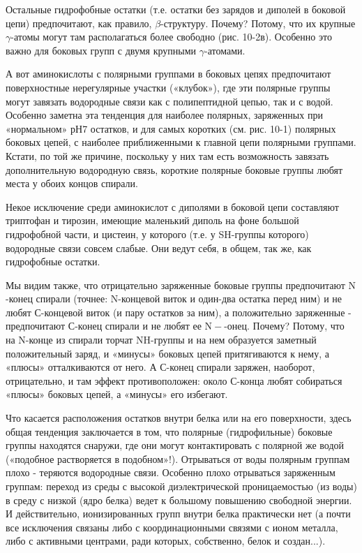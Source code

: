 \documentclass[
11pt,%
tightenlines,%
twoside,%
onecolumn,%
nofloats,%
nobibnotes,%
nofootinbib,%
superscriptaddress,%
noshowpacs,%
centertags]%
{revtex4}
\begin{document}
Остальные гидрофобные остатки (т.е. остатки без зарядов и диполей в боковой цепи) предпочитают, как правило, $\beta$-структуру. Почему? Потому, что их крупные $\gamma$-атомы могут там располагаться более свободно (рис. 10-2в). Особенно это важно для боковых групп с двумя крупными $\gamma$-атомами.

А вот аминокислоты с полярными группами в боковых цепях предпочитают поверхностные нерегулярные участки («клубок»), где эти полярные группы могут завязать водородные связи как с полипептидной цепью, так и с водой. Особенно заметна эта тенденция для наиболее полярных, заряженных при «нормальном» рН7 остатков, и для самых коротких (см. рис. 10-1) полярных боковых цепей, с наиболее приближенными к главной цепи полярными группами. Кстати, по той же причине, поскольку у них там есть возможность завязать дополнительную водородную связь, короткие полярные боковые группы любят места у обоих концов спирали.

Некое исключение среди аминокислот с диполями в боковой цепи составляют триптофан и тирозин, имеющие маленький диполь на фоне большой гидрофобной части, и цистеин, у которого (т.е. у SH-группы которого) водородные связи совсем слабые. Они ведут себя, в общем, так же, как гидрофобные остатки.

Мы видим также, что отрицательно заряженные боковые группы предпочитают $\mathrm{N}$-конец спирали (точнее: $\mathrm{N}$-концевой виток и один-два остатка перед ним) и не любят С-концевой виток (и пару остатков за ним), а положительно заряженные - предпочитают С-конец спирали и не любят ее $\mathrm{N}-$-онец. Почему? Потому, что на N-конце из спирали торчат NH-группы и на нем образуется заметный положительный заряд, и «минусы» боковых цепей притягиваются к нему, а «плюсы» отталкиваются от него. А С-конец спирали заряжен, наоборот, отрицательно, и там эффект противоположен: около С-конца любят собираться «плюсы» боковых цепей, а «минусы» его избегают.


Что касается расположения остатков внутри белка или на его поверхности, здесь общая тенденция заключается в том, что полярные (гидрофильные) боковые группы находятся снаружи, где они могут контактировать с полярной же водой («подобное растворяется в подобном»!). Отрываться от воды полярным группам плохо - теряются водородные связи. Особенно плохо отрываться заряженным группам: переход из среды с высокой диэлектрической проницаемостью (из воды) в среду с низкой (ядро белка) ведет к большому повышению свободной энергии. И действительно, ионизированных групп внутри белка практически нет (а почти все исключения связаны либо с координационными связями с ионом металла, либо с активными центрами, ради которых, собственно, белок и создан...).
\end{document}
